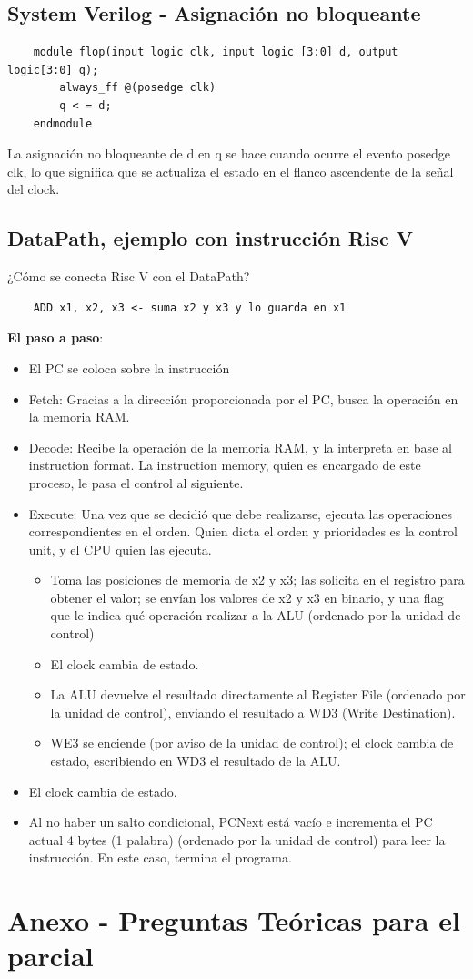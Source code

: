 \documentclass[10pt,a4paper]{article}
\begin{document}
\subsection*{System Verilog - Asignación no bloqueante}
\label{subsec:SVL_bloques_clk}
\begin{lstlisting}
    module flop(input logic clk, input logic [3:0] d, output logic[3:0] q);
        always_ff @(posedge clk)
        q < = d;
    endmodule
\end{lstlisting}
La asignación no bloqueante de d en q se hace cuando ocurre el evento posedge clk, lo que significa que se actualiza el estado en el flanco ascendente de la señal del clock.
\subsection*{DataPath, ejemplo con instrucción Risc V}
\label{subsec:datapath_example}
¿Cómo se conecta Risc V con el DataPath? 
\begin{lstlisting}
    ADD x1, x2, x3 <- suma x2 y x3 y lo guarda en x1
\end{lstlisting}
\textbf{El paso a paso}: 
\begin{itemize}
    \item El PC se coloca sobre la instrucción
    \item Fetch: Gracias a la dirección proporcionada por el PC, busca la operación en la memoria RAM.
    \item Decode: Recibe la operación de la memoria RAM, y la interpreta en base al instruction format. La instruction memory, quien es encargado de este proceso, le pasa el control al siguiente. 
    \item Execute: Una vez que se decidió que debe realizarse, ejecuta las operaciones correspondientes en el orden. Quien dicta el orden y prioridades es la control unit, y el CPU quien las ejecuta.
    \begin{itemize}
        \item Toma las posiciones de memoria de x2 y x3; las solicita en el registro para obtener el valor; se envían los valores de x2 y x3 en binario, y una flag que le indica qué operación realizar a la ALU (ordenado por la unidad de control)
        \item El clock cambia de estado. 
        \item La ALU devuelve el resultado directamente al Register File (ordenado por la unidad de control), enviando el resultado a WD3 (Write Destination).
        \item WE3 se enciende (por aviso de la unidad de control); el clock cambia de estado, escribiendo en WD3 el resultado de la ALU.
    \end{itemize}
    \item El clock cambia de estado. 
    \item Al no haber un salto condicional, PCNext está vacío e incrementa el PC actual 4 bytes (1 palabra) (ordenado por la unidad de control) para leer la instrucción. En este caso, termina el programa. 
\end{itemize}

\section*{Anexo - Preguntas Teóricas para el parcial}
\end{document}
